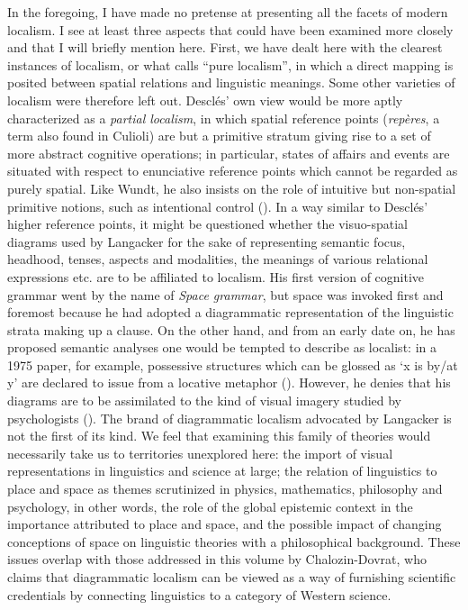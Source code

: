 \documentclass[english,output=paper,colorlinks,citecolor=brown]{../langscibook}
\begin{document}
In the foregoing, I have made no pretense at presenting all the facets of modern localism. I see at least three aspects that could have been examined more closely and that I will briefly mention here. First, we have dealt here with the clearest instances of localism, or what \citet{Desclés1991} calls “pure localism”, in which a direct mapping is posited between spatial relations and linguistic meanings. Some other varieties of localism were therefore left out. Desclés’ own view would be more aptly characterized as a \textit{partial localism}, in which spatial reference points (\textit{repères}, a term also found in Culioli) are but a primitive stratum giving rise to a set of more abstract cognitive operations; in particular, states of affairs and events are situated with respect to enunciative reference points which cannot be regarded as purely spatial. Like Wundt, he also insists on the role of intuitive but non-spatial primitive notions, such as intentional control (\citeyear{Desclés1991, Desclés1993}). In a way similar to Desclés’ higher reference points, it might be questioned whether the visuo-spatial diagrams used by Langacker for the sake of representing semantic focus, headhood, tenses, aspects and modalities, the meanings of various relational expressions etc. are to be affiliated to localism. His first version of cognitive grammar went by the name of \textit{Space grammar}, but space was invoked first and foremost because he had adopted a diagrammatic representation of the linguistic strata making up a clause. On the other hand, and from an early date on, he has proposed semantic analyses one would be tempted to describe as localist: in a 1975 paper, for example, possessive structures which can be glossed as ‘x is by/at y’ are declared to issue from a locative metaphor (\citeyear[384--385]{Langacker1975}). However, he denies that his diagrams are to be assimilated to the kind of visual imagery studied by psychologists (\citeyear[6]{Langacker1986}). The brand of diagrammatic localism advocated by Langacker is not the first of its kind. We feel that examining this family of theories would necessarily take us to territories unexplored here: the import of visual representations in linguistics and science at large; the relation of linguistics to place and space as themes scrutinized in physics, mathematics, philosophy and psychology, in other words, the role of the global epistemic context in the importance attributed to place and space, and the possible impact of changing conceptions of space on linguistic theories with a philosophical background. These issues overlap with those addressed in this volume by Chalozin-Dovrat, who claims that diagrammatic localism can be viewed as a way of furnishing scientific credentials by connecting linguistics to a category of Western science.
\end{document}
